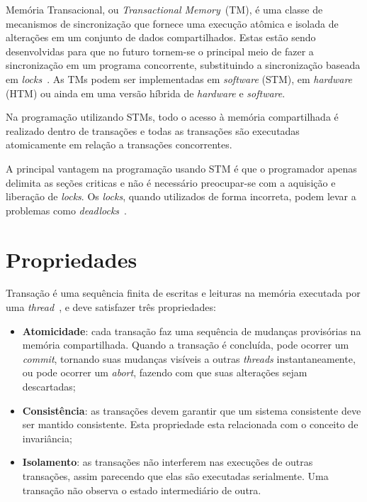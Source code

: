 \documentclass[diss,capa]{texufpel}
\begin{document}
Memória Transacional, ou \emph{Transactional Memory}~(TM), é uma classe de mecanismos de sincronização que fornece uma execução atômica e isolada de alterações em um conjunto de dados compartilhados. Estas estão sendo desenvolvidas para que no futuro tornem-se o principal meio de fazer a sincronização em um programa concorrente, substituindo a sincronização baseada em \emph{locks}~\cite{energyawaretm}. As TMs podem ser implementadas em \emph{software} (STM), em \emph{hardware} (HTM) ou ainda em uma versão híbrida de \emph{hardware} e \emph{software}.

Na programação utilizando STMs, todo o acesso à memória compartilhada é realizado dentro de transações e todas as transações são executadas atomicamente em relação a transações concorrentes.

A principal vantagem na programação usando STM é que o programador apenas delimita as seções criticas e não é necessário preocupar-se com a aquisição e liberação de \emph{locks}. Os \emph{locks}, quando utilizados de forma incorreta, podem levar a problemas como \emph{deadlocks}~\cite{BAND10}.

\section{Propriedades}

Transação é uma sequência finita de escritas e leituras na memória executada por uma \emph{thread}~\cite{herlihy93}, e deve satisfazer três propriedades:

\begin{itemize}
 \item \textbf{Atomicidade}: cada transação faz uma sequência de mudanças provisórias na memória compartilhada. Quando a transação é concluída, pode ocorrer um \emph{commit}, tornando suas mudanças visíveis a outras \emph{threads} instantaneamente, ou pode ocorrer um \emph{abort}, fazendo com que suas alterações sejam descartadas;

 \item \textbf{Consistência}: as transações devem garantir que um sistema consistente deve ser mantido consistente. Esta propriedade esta relacionada com o conceito de invariância;

 \item \textbf{Isolamento}: as transações não interferem nas execuções de outras transações, assim parecendo que elas são executadas serialmente. Uma transação não observa o estado intermediário de outra.
\end{itemize}
\end{document}
